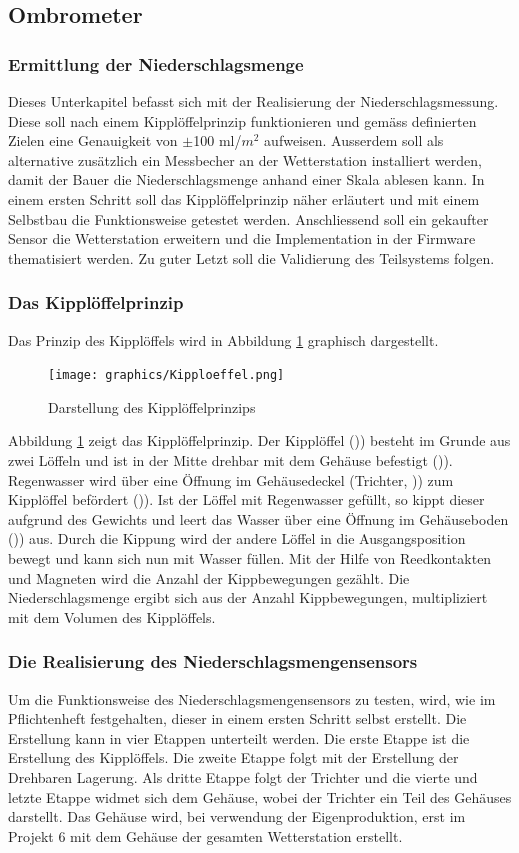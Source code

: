 \subsection{Ombrometer}

\subsubsection*{Ermittlung der Niederschlagsmenge}
Dieses Unterkapitel befasst sich mit der Realisierung der Niederschlagsmessung. Diese soll nach einem Kipplöffelprinzip funktionieren und gemäss definierten Zielen eine Genauigkeit von $\pm$100 ml/$m^2$ aufweisen. Ausserdem soll als alternative zusätzlich ein Messbecher an der Wetterstation installiert werden, damit der Bauer die Niederschlagsmenge anhand einer Skala ablesen kann. In einem ersten Schritt soll das Kipplöffelprinzip näher erläutert und mit einem Selbstbau die Funktionsweise getestet werden. Anschliessend soll ein gekaufter Sensor die Wetterstation erweitern und die Implementation in der Firmware thematisiert werden. Zu guter Letzt soll die Validierung des Teilsystems folgen.
\subsubsection*{Das Kipplöffelprinzip}
Das Prinzip des Kipplöffels wird in Abbildung \ref{fig:Kipp} graphisch dargestellt.

\begin{figure}[h]
\centering
\texttt{[image: graphics/Kipploeffel.png]}
\caption{Darstellung des Kipplöffelprinzips}
\label{fig:Kipp}
\end{figure}

Abbildung \ref{fig:Kipp} zeigt das Kipplöffelprinzip. Der Kipplöffel ()\grqq) besteht im Grunde aus zwei Löffeln und ist in der Mitte drehbar mit dem Gehäuse befestigt ()\grqq). Regenwasser wird über eine Öffnung im Gehäusedeckel (Trichter, )\grqq) zum Kipplöffel befördert ()\grqq). Ist der Löffel mit Regenwasser gefüllt, so kippt dieser aufgrund des Gewichts und leert das Wasser über eine Öffnung im Gehäuseboden ()\grqq) aus. Durch die Kippung wird der andere Löffel in die Ausgangsposition bewegt und kann sich nun mit Wasser füllen. Mit der Hilfe von Reedkontakten und Magneten wird die Anzahl der Kippbewegungen gezählt. Die Niederschlagsmenge ergibt sich aus der Anzahl Kippbewegungen, multipliziert mit dem Volumen des Kipplöffels.
\newpage

\subsubsection*{Die Realisierung des Niederschlagsmengensensors}
Um die Funktionsweise des Niederschlagsmengensensors  zu testen, wird, wie im Pflichtenheft festgehalten, dieser in einem ersten Schritt selbst erstellt. Die Erstellung kann in vier Etappen unterteilt werden. Die erste Etappe ist die Erstellung des Kipplöffels. Die zweite Etappe folgt mit der Erstellung der Drehbaren Lagerung. Als dritte Etappe folgt der Trichter und die vierte und letzte Etappe widmet sich dem Gehäuse, wobei der Trichter ein Teil des Gehäuses darstellt. Das Gehäuse wird, bei verwendung der Eigenproduktion, erst im Projekt 6 mit dem Gehäuse der gesamten Wetterstation erstellt.
